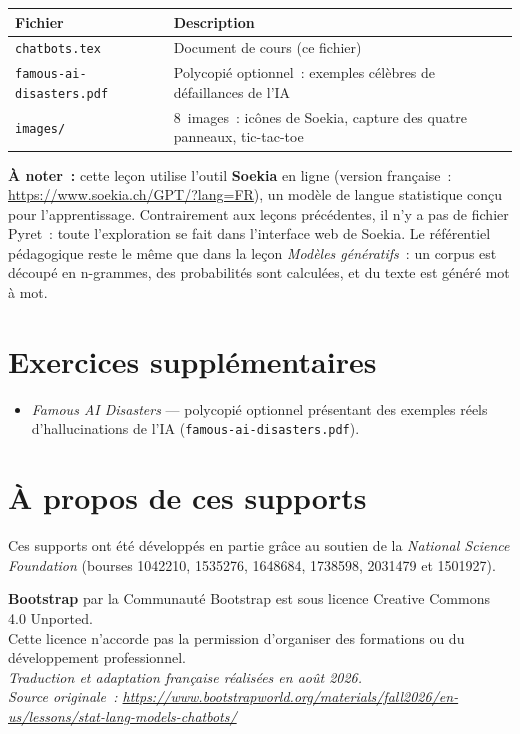 \documentclass[12pt,a4paper]{article}
\begin{document}
\begin{center}
\begin{tabularx}{\textwidth}{l X}
  \toprule
  \textbf{Fichier} & \textbf{Description} \\
  \midrule
  \texttt{chatbots.tex} & Document de cours (ce fichier) \\
  \texttt{famous-ai-disasters.pdf} & Polycopié optionnel~: exemples célèbres de défaillances de l'IA \\
  \texttt{images/} & 8~images~: icônes de Soekia, capture des quatre panneaux, tic-tac-toe \\
  \bottomrule
\end{tabularx}
\end{center}

\vspace{1em}
\textbf{À noter~:} cette leçon utilise l'outil \textbf{Soekia} en ligne (version française~: \url{https://www.soekia.ch/GPT/?lang=FR}), un modèle de langue statistique conçu pour l'apprentissage. Contrairement aux leçons précédentes, il n'y a pas de fichier Pyret~: toute l'exploration se fait dans l'interface web de Soekia. Le référentiel pédagogique reste le même que dans la leçon \emph{Modèles génératifs}~: un corpus est découpé en n-grammes, des probabilités sont calculées, et du texte est généré mot à mot.

\section*{Exercices supplémentaires}

\begin{itemize}
  \item \emph{Famous AI Disasters} — polycopié optionnel présentant des exemples réels d'hallucinations de l'IA (\texttt{famous-ai-disasters.pdf}).
\end{itemize}

\section*{À propos de ces supports}

Ces supports ont été développés en partie grâce au soutien de la \emph{National Science Foundation} (bourses 1042210, 1535276, 1648684, 1738598, 2031479 et 1501927).

\begin{center}
  \textbf{Bootstrap} par la Communauté Bootstrap est sous licence Creative Commons 4.0 Unported.\\
  Cette licence n'accorde pas la permission d'organiser des formations ou du développement professionnel.\\[1em]
  \textit{Traduction et adaptation française réalisées en août 2026.}\\
  \textit{Source originale~: \url{https://www.bootstrapworld.org/materials/fall2026/en-us/lessons/stat-lang-models-chatbots/}}
\end{center}
\end{document}
